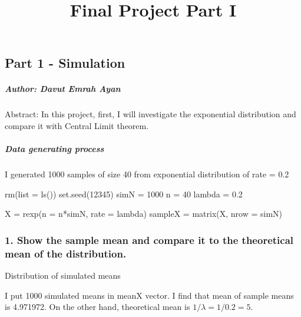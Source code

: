 \documentclass[
]{article}
\title{Final Project Part I}
\author{}
\date{\vspace{-2.5em}}
\newenvironment{Shaded}{\begin{snugshade}}{\end{snugshade}}
\newcommand{\AttributeTok}[1]{\textcolor[rgb]{0.77,0.63,0.00}{#1}}
\newcommand{\DecValTok}[1]{\textcolor[rgb]{0.00,0.00,0.81}{#1}}
\newcommand{\FloatTok}[1]{\textcolor[rgb]{0.00,0.00,0.81}{#1}}
\newcommand{\FunctionTok}[1]{\textcolor[rgb]{0.00,0.00,0.00}{#1}}
\newcommand{\NormalTok}[1]{#1}
\newcommand{\OtherTok}[1]{\textcolor[rgb]{0.56,0.35,0.01}{#1}}
\newcommand{\SpecialCharTok}[1]{\textcolor[rgb]{0.00,0.00,0.00}{#1}}
\begin{document}
\maketitle

{
\setcounter{tocdepth}{2}
\tableofcontents
}
\hypertarget{part-1---simulation}{%
\subsection{Part 1 - Simulation}\label{part-1---simulation}}

\hypertarget{author-davut-emrah-ayan}{%
\subparagraph{Author: Davut Emrah Ayan}\label{author-davut-emrah-ayan}}

Abstract: In this project, first, I will investigate the exponential
distribution and compare it with Central Limit theorem.

\hypertarget{data-generating-process}{%
\subparagraph{Data generating process}\label{data-generating-process}}

I generated 1000 samples of size 40 from exponential distribution of
rate = 0.2

\begin{Shaded}
\begin{Highlighting}[]
\FunctionTok{rm}\NormalTok{(}\AttributeTok{list =} \FunctionTok{ls}\NormalTok{())}
\FunctionTok{set.seed}\NormalTok{(}\DecValTok{12345}\NormalTok{)}
\NormalTok{simN }\OtherTok{=} \DecValTok{1000}
\NormalTok{n }\OtherTok{=} \DecValTok{40}
\NormalTok{lambda }\OtherTok{=} \FloatTok{0.2}

\NormalTok{X }\OtherTok{=} \FunctionTok{rexp}\NormalTok{(}\AttributeTok{n =}\NormalTok{ n}\SpecialCharTok{*}\NormalTok{simN, }\AttributeTok{rate =}\NormalTok{ lambda)}
\NormalTok{sampleX }\OtherTok{=} \FunctionTok{matrix}\NormalTok{(X, }\AttributeTok{nrow =}\NormalTok{ simN)}
\end{Highlighting}
\end{Shaded}

\hypertarget{show-the-sample-mean-and-compare-it-to-the-theoretical-mean-of-the-distribution.}{%
\subsubsection{1. Show the sample mean and compare it to the theoretical
mean of the
distribution.}\label{show-the-sample-mean-and-compare-it-to-the-theoretical-mean-of-the-distribution.}}

Distribution of simulated means

I put 1000 simulated means in meanX vector. I find that mean of sample
means is 4.971972. On the other hand, theoretical mean is
\(1/\lambda = 1/0.2 = 5\).
\end{document}
